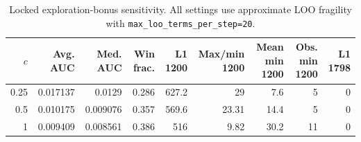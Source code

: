 \begin{table}[htbp]
\centering
\small
\caption{Locked exploration-bonus sensitivity. All settings use approximate LOO fragility with \texttt{max\_loo\_terms\_per\_step=20}.}
\label{tab:exploration-bonus-sensitivity}
\begin{tabular}{rrrrrrrrr}
\toprule
$c$ & Avg. AUC & Med. AUC & Win frac. & L1 1200 & Max/min 1200 & Mean min 1200 & Obs. min 1200 & L1 1798 \\
\midrule
0.25 & 0.017137 & 0.0129 & 0.286 & 627.2 & 29 & 7.6 & 5 & 0 \\
0.5 & 0.010175 & 0.009076 & 0.357 & 569.6 & 23.31 & 14.4 & 5 & 0 \\
1 & 0.009409 & 0.008561 & 0.386 & 516 & 9.82 & 30.2 & 11 & 0 \\
\bottomrule
\end{tabular}
\end{table}
